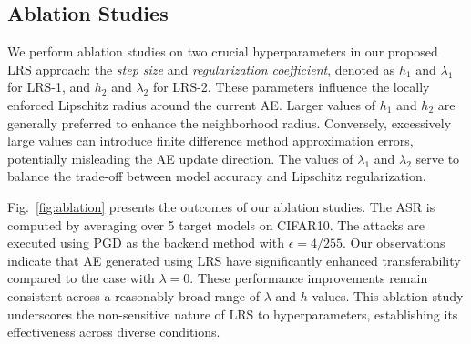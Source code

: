 \documentclass[letterpaper]{article} %
\theoremstyle{plain}
\theoremstyle{definition}
\newcommand{\fref}[1]{Fig.~\ref{#1}}
\begin{document}
\subsection{Ablation Studies}
We perform ablation studies on two crucial hyperparameters in our proposed LRS approach: the \emph{step size} and \emph{regularization coefficient}, denoted as $h_1$ and $\lambda_1$ for LRS-1, and $h_2$ and $\lambda_2$ for LRS-2. These parameters influence the locally enforced Lipschitz radius around the current AE. Larger values of $h_1$ and $h_2$ are generally preferred to enhance the neighborhood radius. Conversely, excessively large values can introduce finite difference method approximation errors, potentially misleading the AE update direction. The values of $\lambda_1$ and $\lambda_2$ serve to balance the trade-off between model accuracy and Lipschitz regularization.

\fref{fig:ablation} presents the outcomes of our ablation studies. The ASR is computed by averaging over 5 target models on CIFAR10. The attacks are executed using PGD as the backend method with $\epsilon=4/255$. Our observations indicate that AE generated using LRS have significantly enhanced transferability compared to the case with $\lambda=0$. These performance improvements remain consistent across a reasonably broad range of $\lambda$ and $h$ values. This ablation study underscores the non-sensitive nature of LRS to hyperparameters, establishing its effectiveness across diverse conditions.
\end{document}
